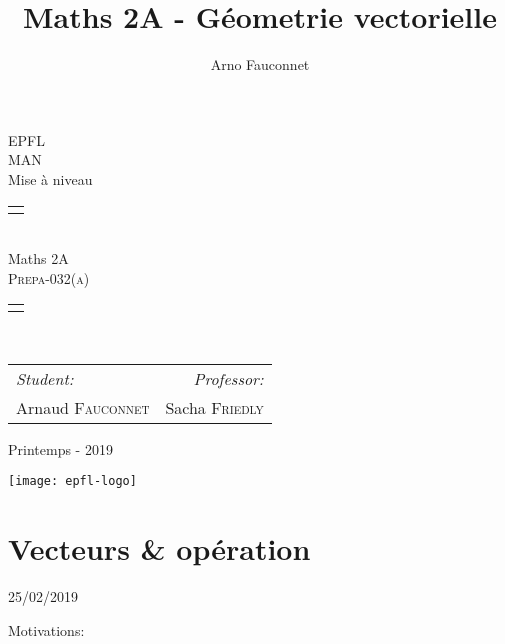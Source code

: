 \documentclass[
    11pt,
    a4paper,
    oneside,
    headinlcude, footinclude,
    twoside,
]{report}
\title{Maths 2A - Géometrie vectorielle}
\author{Arno Fauconnet}
\newcommand{\markDate}[1]{\begin{flushright}#1\end{flushright}}
\begin{document}
\begin{titlepage}
   \begin{center}
       \vspace*{\fill}

       {\Huge EPFL}\\ 
       \vfill
       {\huge MAN}\\ [1em]
       {\Large Mise à niveau}\\
        \vfill
        \begin{tabularx}{\textwidth}{X}
            \Xhline{3\arrayrulewidth}\\
        \end{tabularx}\\ [2em]
        {\Huge Maths 2A} \\ [1em]
        \textsc{\huge Prepa-032(a)} \\ [2em]
        \begin{tabularx}{\textwidth}{X}
            \Xhline{3\arrayrulewidth}\\
        \end{tabularx}\\ [2em]
        \vspace{.7cm}
        {\large
        \begin{tabularx}{.9\textwidth}{Xr}
            \textit{Student:} & \textit{Professor:}\\
            Arnaud \textsc{Fauconnet} & Sacha \textsc{Friedly}
        \end{tabularx}}
        \vfill
        {\Large Printemps - 2019}

        \vfill
        \texttt{[image: epfl-logo]}

       \vfill
   \end{center} 
\end{titlepage} 
\setcounter{chapter}{0}
\chapter{Vecteurs \& opération}
\markDate{25/02/2019}

Motivations:
\end{document}
